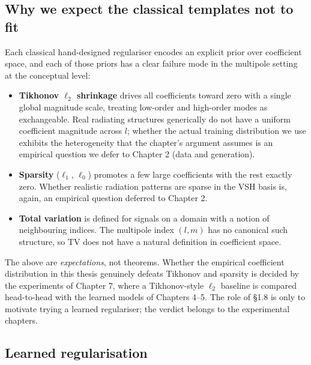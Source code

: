 \documentclass[
  english,
  11pt,
]{report}
\providecommand{\tightlist}{%
  \setlength{\itemsep}{0pt}\setlength{\parskip}{0pt}}
\begin{document}
\subsection{Why we expect the classical templates not to
fit}\label{why-we-expect-the-classical-templates-not-to-fit}

Each classical hand-designed regulariser encodes an explicit prior over
coefficient space, and each of those priors has a clear failure mode in
the multipole setting at the conceptual level:

\begin{itemize}
\tightlist
\item
  \textbf{Tikhonov \(\ell_2\) shrinkage} drives all coefficients toward
  zero with a single global magnitude scale, treating low-order and
  high-order modes as exchangeable. Real radiating structures
  generically do not have a uniform coefficient magnitude across \(l\);
  whether the actual training distribution we use exhibits the
  heterogeneity that the chapter's argument assumes is an empirical
  question we defer to Chapter 2 (data and generation).
\item
  \textbf{Sparsity} (\(\ell_1\), \(\ell_0\)) promotes a few large
  coefficients with the rest exactly zero. Whether realistic radiation
  patterns are sparse in the VSH basis is, again, an empirical question
  deferred to Chapter 2.
\item
  \textbf{Total variation} is defined for signals on a domain with a
  notion of neighbouring indices. The multipole index \((l,m)\) has no
  canonical such structure, so TV does not have a natural definition in
  coefficient space.
\end{itemize}

The above are \emph{expectations}, not theorems. Whether the empirical
coefficient distribution in this thesis genuinely defeats Tikhonov and
sparsity is decided by the experiments of Chapter 7, where a
Tikhonov-style \(\ell_2\) baseline is compared head-to-head with the
learned models of Chapters 4--5. The role of §1.8 is only to motivate
trying a learned regulariser; the verdict belongs to the experimental
chapters.

\subsection{Learned regularisation}\label{learned-regularisation}
\end{document}
